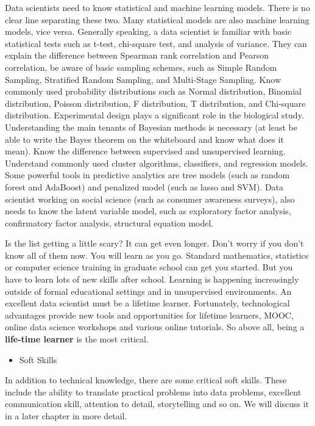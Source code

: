 \documentclass[12pt,]{krantz}
\providecommand{\tightlist}{%
  \setlength{\itemsep}{0pt}\setlength{\parskip}{0pt}}
\theoremstyle{definition}
\theoremstyle{definition}
\theoremstyle{definition}
\theoremstyle{remark}
\begin{document}
Data scientists need to know statistical and machine learning models.
There is no clear line separating these two. Many statistical models are
also machine learning models, vice versa. Generally speaking, a data
scientist is familiar with basic statistical tests such as t-test,
chi-square test, and analysis of variance. They can explain the
difference between Spearman rank correlation and Pearson correlation, be
aware of basic sampling schemes, such as Simple Random Sampling,
Stratified Random Sampling, and Multi-Stage Sampling. Know commonly used
probability distributions such as Normal distribution, Binomial
distribution, Poisson distribution, F distribution, T distribution, and
Chi-square distribution. Experimental design plays a significant role in
the biological study. Understanding the main tenants of Bayesian methods
is necessary (at least be able to write the Bayes theorem on the
whiteboard and know what does it mean). Know the difference between
supervised and unsupervised learning. Understand commonly used cluster
algorithms, classifiers, and regression models. Some powerful tools in
predictive analytics are tree models (such as random forest and
AdaBoost) and penalized model (such as lasso and SVM). Data scientist
working on social science (such as consumer awareness surveys), also
needs to know the latent variable model, such as exploratory factor
analysis, confirmatory factor analysis, structural equation model.

Is the list getting a little scary? It can get even longer. Don't worry
if you don't know all of them now. You will learn as you go. Standard
mathematics, statistics or computer science training in graduate school
can get you started. But you have to learn lots of new skills after
school. Learning is happening increasingly outside of formal educational
settings and in unsupervised environments. An excellent data scientist
must be a lifetime learner. Fortunately, technological advantages
provide new tools and opportunities for lifetime learners, MOOC, online
data science workshops and various online tutorials. So above all, being
a \textbf{life-time learner} is the most critical.

\begin{itemize}
\tightlist
\item
  Soft Skills
\end{itemize}

In addition to technical knowledge, there are some critical soft skills.
These include the ability to translate practical problems into data
problems, excellent communication skill, attention to detail,
storytelling and so on. We will discuss it in a later chapter in more
detail.
\end{document}
